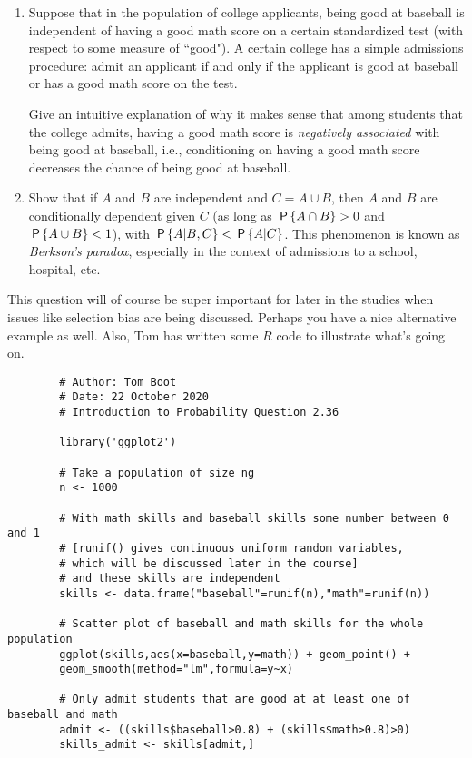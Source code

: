 

\setcounter{theorem}{17}
\begin{exercise}[BH.2.36]
	\begin{enumerate}
		\item Suppose that in the population of college applicants, being good at baseball is independent of having a good math score on a certain standardized test (with respect to some measure of ``good"). A certain college has a simple admissions procedure: admit an applicant if and only if the applicant is good at baseball or has a good math score on the test.
	
		Give an intuitive explanation of why it makes sense that among students that the college admits, having a good math score is \emph{negatively associated} with being good at baseball, i.e., conditioning on having a good math score decreases the chance of being good at baseball.
		\item Show that if $A$ and $B$ are independent and $C = A \cup B$, then $A$ and $B$ are conditionally dependent given $C$ (as long as $\P{A \cap B} > 0$ and $\P{A \cup B} < 1$), with $\P{A|B, C} < \P{A|C}$. This phenomenon is known as \emph{Berkson's paradox}, especially in the context of admissions to a school, hospital, etc.
	\end{enumerate}
\begin{solution}
	This question will of course be super important for later in the studies when issues like selection bias are being discussed. Perhaps you have a nice alternative example as well. Also, Tom has written some $R$ code to illustrate what's going on.
	\begin{verbatim}
		# Author: Tom Boot
		# Date: 22 October 2020
		# Introduction to Probability Question 2.36
		
		library('ggplot2')
		
		# Take a population of size ng
		n <- 1000
		
		# With math skills and baseball skills some number between 0 and 1
		# [runif() gives continuous uniform random variables, 
		# which will be discussed later in the course]
		# and these skills are independent
		skills <- data.frame("baseball"=runif(n),"math"=runif(n))
		
		# Scatter plot of baseball and math skills for the whole population
		ggplot(skills,aes(x=baseball,y=math)) + geom_point() + 
		geom_smooth(method="lm",formula=y~x)
		
		# Only admit students that are good at at least one of baseball and math
		admit <- ((skills$baseball>0.8) + (skills$math>0.8)>0)
		skills_admit <- skills[admit,]
		

\end{verbatim}
\end{solution}
\end{exercise}
